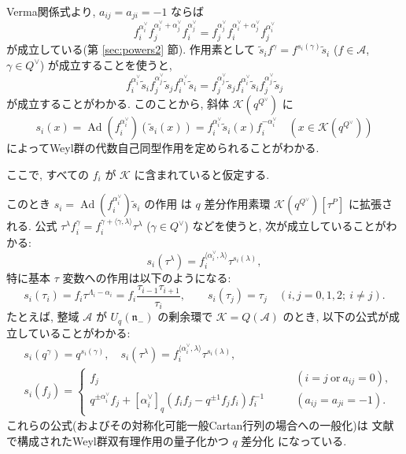 \documentclass[12pt,twoside,dvipdfm]{msjproc}
\theoremstyle{definition} %
\theoremstyle{definition} %
\theoremstyle{definition} %
\numberwithin{theorem}{section}
\numberwithin{equation}{section}
\numberwithin{figure}{section}
\numberwithin{table}{section}
\newcommand\secref[1]{第 \ref{#1} 節}
\newcommand\nil{\mathfrak{n}}
\newcommand\bra{\langle}
\newcommand\ket{\rangle}
\newcommand\A{\mathcal{A}}
\newcommand\K{\mathcal{K}}
\newcommand\Ad{\mathop{\mathrm{Ad}}\nolimits}
\newcommand\ts{{\tilde{s}}}
\newcommand\av{\alpha^\vee}
\newcommand\Qv{{Q^\vee}}
\begin{document}
Verma関係式より, $a_{ij}=a_{ji}=-1$ ならば 
\begin{equation*}
   f_i^{\av_i} f_j^{\av_i+\av_j} f_i^{\av_j}
 = f_j^{\av_j} f_i^{\av_i+\av_j} f_j^{\av_i}
\end{equation*}
が成立している(\secref{sec:powers2}). 
作用素として $\ts_i f^\gamma = f^{s_i(\gamma)} \ts_i$ ($f\in\A$, $\gamma\in\Qv$) 
が成立することを使うと,
\begin{equation*}
   f_i^{\av_i}\ts_i f_j^{\av_j}\ts_j f_i^{\av_i}\ts_i
 = f_j^{\av_j}\ts_j f_i^{\av_i}\ts_i f_j^{\av_j}\ts_j
\end{equation*}
が成立することがわかる. このことから, 斜体 $\K(q^\Qv)$ に
\begin{equation*}
  s_i(x) = \Ad(f_i^{\av_i})(\ts_i(x)) = f_i^{\av_i} \ts_i(x) f_i^{-\av_i}
  \quad (x\in\K(q^\Qv))
\end{equation*}
によってWeyl群の代数自己同型作用を定められることがわかる.

ここで, すべての $f_i$ が $\K$ に含まれていると仮定する.

このとき $s_i=\Ad(f_i^{\av_i})\ts_i$ の作用
は $q$ 差分作用素環 $\K(q^\Qv)[\tau^P]$ に拡張される.
公式 $\tau^\lambda f_i^{\gamma} = f_i^{\gamma+\bra\gamma,\lambda\ket}\tau^\lambda$ 
($\gamma\in\Qv$) などを使うと,
次が成立していることがわかる:
\begin{equation*}
 s_i(\tau^\lambda) = f_i^{\bra\av_i,\lambda\ket}\tau^{s_i(\lambda)},
\end{equation*}
特に基本 $\tau$ 変数への作用は以下のようになる:
\begin{equation*}
 s_i(\tau_i)=f_i\tau^{\Lambda_i-\alpha_i}
 = f_i \frac{\tau_{i-1}\tau_{i+1}}{\tau_i},
 \qquad 
 s_i(\tau_j)=\tau_j \quad (i,j=0,1,2;\ i\ne j).
\end{equation*}
たとえば, 整域 $\A$ が $U_q(\nil_-)$ の剰余環で $\K=Q(\A)$ のとき, 
以下の公式が成立していることがわかる:
\begin{align*}
 &
 s_i(q^\gamma) = q^{s_i(\gamma)},
 \quad
 s_i(\tau^\lambda) = f_i^{\bra\av_i,\lambda\ket}\tau^{s_i(\lambda)},
 \\ &
 s_i(f_j) = 
 \begin{cases}
  f_j & \qquad (i=j \ \text{or}\ a_{ij}=0), \\
  q^{\pm\av_i}f_j + [\av_i]_q(f_if_j-q^{\pm1}f_jf_i)f_i^{-1} & \qquad (a_{ij}=a_{ji}=-1).
 \end{cases}
\end{align*}
これらの公式(およびその対称化可能一般Cartan行列の場合への一般化)は
文献 \cite{NY-BWA} で構成されたWeyl群双有理作用の量子化かつ $q$ 差分化
になっている.
\end{document}
